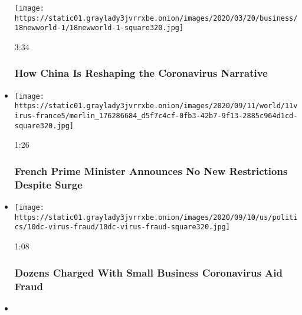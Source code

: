 \begin{itemize}
  \texttt{[image: https://static01.graylady3jvrrxbe.onion/images/2020/03/20/business/18newworld-1/18newworld-1-square320.jpg]}

  3:34

  \hypertarget{how-china-is-reshaping-the-coronavirus-narrative}{%
  \subsubsection{How China Is Reshaping the Coronavirus
  Narrative}\label{how-china-is-reshaping-the-coronavirus-narrative}}
\item
  \href{https://www.nytimes3xbfgragh.onion/video/world/europe/100000007336352/france-coronavirus-testing.html?action=click\&module=video-series-bar\&region=header\&pgtype=Article\&playlistId=video/coronavirus-news-update}{}

  \texttt{[image: https://static01.graylady3jvrrxbe.onion/images/2020/09/11/world/11virus-france5/merlin\_176286684\_d5f7c4cf-0fb3-42b7-9f13-2885c964d1cd-square320.jpg]}

  1:26

  \hypertarget{french-prime-minister-announces-no-new-restrictions-despite-surge}{%
  \subsubsection{French Prime Minister Announces No New Restrictions
  Despite
  Surge}\label{french-prime-minister-announces-no-new-restrictions-despite-surge}}
\item
  \href{https://www.nytimes3xbfgragh.onion/video/us/politics/100000007334200/coronavirus-paycheck-protection-fraud.html?action=click\&module=video-series-bar\&region=header\&pgtype=Article\&playlistId=video/coronavirus-news-update}{}

  \texttt{[image: https://static01.graylady3jvrrxbe.onion/images/2020/09/10/us/politics/10dc-virus-fraud/10dc-virus-fraud-square320.jpg]}

  1:08

  \hypertarget{dozens-charged-with-small-business-coronavirus-aid-fraud}{%
  \subsubsection{Dozens Charged With Small Business Coronavirus Aid
  Fraud}\label{dozens-charged-with-small-business-coronavirus-aid-fraud}}
\item
  \href{https://www.nytimes3xbfgragh.onion/video/us/politics/100000007334214/senate-stimulus-coronavius.html?action=click\&module=video-series-bar\&region=header\&pgtype=Article\&playlistId=video/coronavirus-news-update}{}


\end{itemize}
